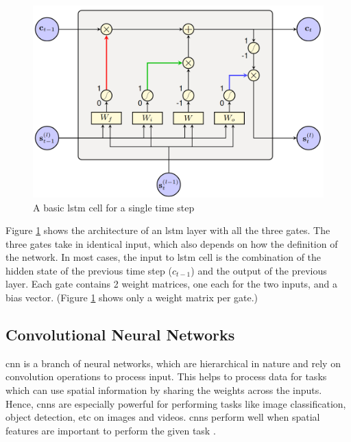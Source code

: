 \begin{figure}[ht]
  \begin{center}
    \includegraphics[width=\textwidth]{images/lstm.png} 
    \caption{A basic \acrshort{lstm} cell for a single time step \cite{Enarvi2018ModelingRecognition}}
    \label{fig:lstm}
  \end{center}
\end{figure}

Figure \ref{fig:lstm} shows the architecture of an \acrshort{lstm} layer with all the three gates. The three gates take in identical input, which also depends on how the definition of the network. In most cases, the input to \acrshort{lstm} cell is the combination of the hidden state of the previous time step ($c_{t-1}$) and the output of the previous layer. Each gate contains 2 weight matrices, one each for the two inputs, and a bias vector. (Figure \ref{fig:lstm} shows only a weight matrix per gate.) 


\subsection {Convolutional Neural Networks}
\acrfull{cnn} is a branch of neural networks, which are hierarchical in nature and rely on convolution operations to process input. This helps to process data for tasks which can use spatial information by sharing the weights across the inputs. Hence, \acrshort{cnn}s  are especially powerful for performing tasks like image classification, object detection, etc on images and videos. \acrshort{cnn}s perform well when spatial features are important to perform the given task \cite{Krizhevsky2012ImageNetNetworks}.

